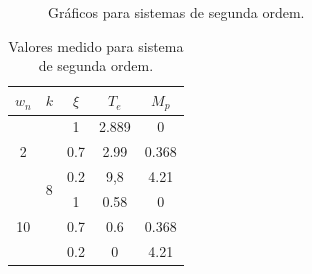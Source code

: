 \documentclass[a4paper]{article}
\begin{document}
\begin{figure}[h]
   \caption{Gráficos para sistemas de segunda ordem.}
   \label{fig:segunda_ordem}
\end{figure}

\begin{table}[h]
   \begin{center}
   \begin{tabular}{| c | c | c | c | c |}
      \hline
      \textbf{$w_n$} & \textbf{$k$}	      & \textbf{$\xi$} & \textbf{$T_e$} & \textbf{$M_p$} \\\hline
	\multirow{3}{*}{2} &\multirow{6}{*}{8}&	     1	      &	     2.889    &		0	 \\\cline{3-5}
	 	 	   &	   	     &	     0.7       &     2.99     &		0.368	 \\\cline{3-5}
	        	   &	   	     &	     0.2       &     9,8     &	        4.21 \\\cline{1-1} \cline{3-5}
	\multirow{3}{*}{10} &		     &	     1	      &	     0.58    &		0	 \\\cline{3-5}
	 	 	   &	   	     &	     0.7       &     0.6     &		0.368	 \\\cline{3-5}
	        	   &	   	     &	     0.2       &     0     &	        4.21 \\\hline
   \end{tabular}                                    
   \end{center}
   \caption{Valores medido para sistema de segunda ordem.}
   \label{tab:segunda_ordem}
\end{table}



 
\end{document}
